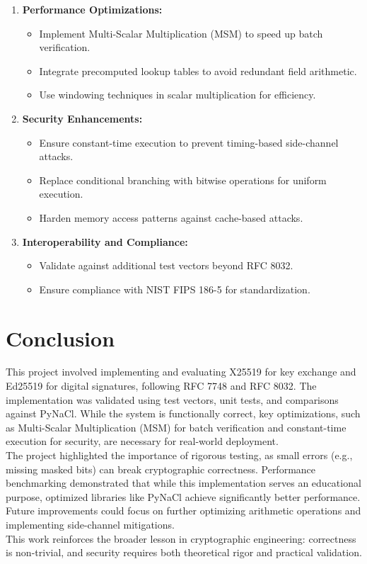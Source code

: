 \documentclass[twoside,a4paper,12pt]{article}
\begin{document}
\begin{enumerate}
    \item \textbf{Performance Optimizations:}
    \begin{itemize}
        \item Implement {Multi-Scalar Multiplication (MSM)} to speed up batch verification.
        \item Integrate {precomputed lookup tables} to avoid redundant field arithmetic.
        \item Use {windowing techniques} in scalar multiplication for efficiency.
    \end{itemize}
      
    \item \textbf{Security Enhancements:}
    \begin{itemize}
        \item Ensure {constant-time execution} to prevent timing-based side-channel attacks.
        \item Replace conditional branching with {bitwise operations} for uniform execution.
        \item Harden memory access patterns against {cache-based attacks}.
    \end{itemize}

    \item \textbf{Interoperability and Compliance:}
    \begin{itemize}
        \item Validate against additional {test vectors} beyond RFC 8032.
        \item Ensure compliance with {NIST FIPS 186-5} for standardization.
    \end{itemize}
\end{enumerate}

\section{Conclusion}
This project involved implementing and evaluating X25519 for key exchange and Ed25519 for digital signatures, following RFC 7748 and RFC 8032. The implementation was validated using test vectors, unit tests, and comparisons against PyNaCl. While the system is functionally correct, key optimizations, such as Multi-Scalar Multiplication (MSM) for batch verification and constant-time execution for security, are necessary for real-world deployment. \\

The project highlighted the importance of rigorous testing, as small errors (e.g., missing masked bits) can break cryptographic correctness. Performance benchmarking demonstrated that while this implementation serves an educational purpose, optimized libraries like PyNaCl achieve significantly better performance. Future improvements could focus on further optimizing arithmetic operations and implementing side-channel mitigations. \\

This work reinforces the broader lesson in cryptographic engineering: correctness is non-trivial, and security requires both theoretical rigor and practical validation.

\newpage
\printbibliography
\end{document}

